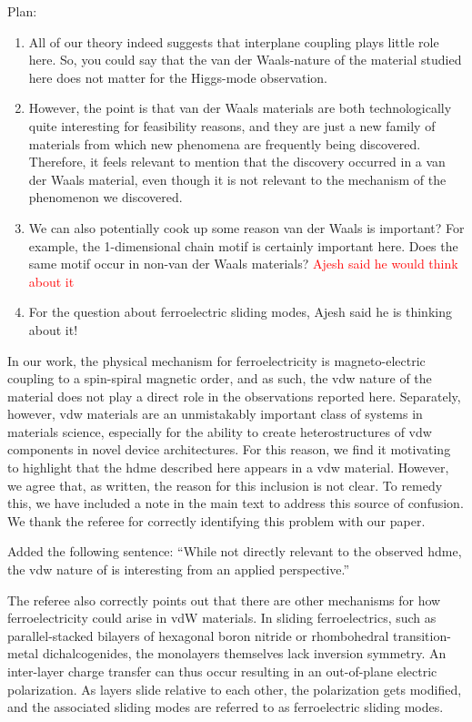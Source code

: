 Plan:
\begin{enumerate}
\item All of our theory indeed suggests that interplane coupling plays little role here.
So, you could say that the van der Waals-nature of the material studied here does not matter for the Higgs-mode observation.
\item However, the point is that van der Waals materials are both technologically quite interesting for feasibility reasons, and they are just a new family of materials from which new phenomena are frequently being discovered.
Therefore, it feels relevant to mention that the discovery occurred in a van der Waals material, even though it is not relevant to the mechanism of the phenomenon we discovered.
\item We can also potentially cook up some reason van der Waals is important?
For example, the 1-dimensional chain motif is certainly important here.
Does the same motif occur in non-van der Waals materials?
\textcolor{red}{Ajesh said he would think about it}
\item For the question about ferroelectric sliding modes, Ajesh said he is thinking about it!
\end{enumerate}

In our work, the physical mechanism for ferroelectricity is magneto-electric coupling to a spin-spiral magnetic order, and as such, the \gls{vdw} nature of the material does not play a direct role in the observations reported here.
Separately, however, \gls{vdw} materials are an unmistakably important class of systems in materials science, especially for the ability to create heterostructures of \gls{vdw} components in novel device architectures.
For this reason, we find it motivating to highlight that the \gls{hdme} described here appears in a \gls{vdw} material.
However, we agree that, as written, the reason for this inclusion is not clear.
To remedy this, we have included a note in the main text to address this source of confusion.
We thank the referee for correctly identifying this problem with our paper.

\begin{changesmade}
Added the following sentence: ``While not directly relevant to the observed \gls{hdme}, the \gls{vdw} nature of  is interesting from an applied perspective.''
\end{changesmade}

The referee also correctly points out that there are other mechanisms for how ferroelectricity could arise in vdW materials.
In sliding ferroelectrics, such as parallel-stacked bilayers of hexagonal boron nitride or rhombohedral transition-metal dichalcogenides, the monolayers themselves lack inversion symmetry.
An inter-layer charge transfer can thus occur resulting in an out-of-plane electric polarization. 
As layers slide relative to each other, the polarization gets modified, and the associated sliding modes are referred to as ferroelectric sliding modes. 

